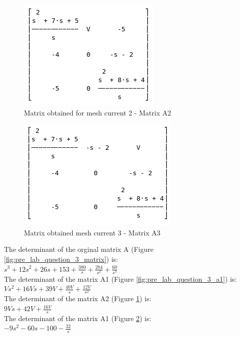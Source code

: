 \documentclass[12pt, a4paper]{article}
\begin{document}
	\begin{figure}[H]
		\centering
		\includegraphics[width=\textwidth]{pre_lab_question_3_a2}
		\caption{Matrix obtained for mesh current 2 - Matrix A2}
		\label{fig:pre_lab_question_3_a2}
	\end{figure}

	\begin{figure}[H]
		\centering
		\includegraphics[width=\textwidth]{pre_lab_question_3_a3}
		\caption{Matrix obtained mesh current 3 - Matrix A3}
		\label{fig:pre_lab_question_3_a3}
	\end{figure}

	The determinant of the orginal matrix A (Figure \ref{fig:pre_lab_question_3_matrix}) is:\\
	\texttt{$s^3+12s^2+26s+153+\frac{380}{s}+\frac{284}{s^2}+\frac{60}{s^3}$}\\
	The determinant of the matrix A1 (Figure \ref{fig:pre_lab_question_3_a1}) is:\\
	\texttt{$Vs^2+16Vs+39V+\frac{40V}{s}+\frac{12V}{s^2}$}\\
	The determinant of the matrix A2 (Figure \ref{fig:pre_lab_question_3_a2}) is:\\
	\texttt{$9Vs+42V+\frac{16V}{s}$}\\
	The determinant of the matrix A1 (Figure \ref{fig:pre_lab_question_3_a3}) is:\\
	\texttt{$-9s^2-60s-100-\frac{32}{s}$}
\end{document}
